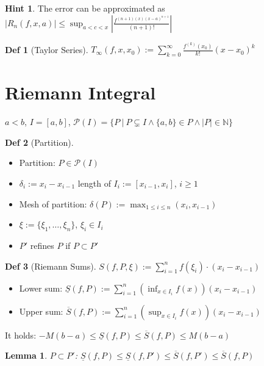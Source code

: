\documentclass[a4paper, 10pt]{article}
\newtheorem*{lemma}{Lemma}
\theoremstyle{definition}
\newtheorem*{definition}{Def}
\newtheorem*{note_wrapper}{Hint}
\theoremstyle{named}
\newenvironment{note}%
    {\begin{mdframed}[style=trick]\begin{note_wrapper}}%
    {\end{note_wrapper}\end{mdframed}}
\newcommand{\N}{\mathbb{N}}
\begin{document}
\begin{note}
    The error can be approximated as $|R_n(f, x, a)| \leq \sup_{a < c < x}|\frac{f^{(n + 1)(x)(x-a)^{n+1}}}{(n+1)!}|$
\end{note}

\begin{definition}[Taylor Series]
    $T_\infty(f, x, x_0) := \sum_{k = 0}^\infty \frac{f^{(k)}(x_0)}{k!}(x-x_0)^k$
\end{definition}

\section{Riemann Integral}
\begin{center}
    $a < b$, $I = [a, b]$, $\mathcal{P}(I) = \{P \ | \ P \subsetneq I \land \{a, b\} \in P \land |P| \in \N \}$
\end{center}
\begin{definition}[Partition]
    \begin{itemize}
        \item Partition:  $P \in \mathcal{P}(I)$
        \item $\delta_i := x_i - x_{i-1}$ length of $I_i := [x_{i-1}, x_i]$, $i \geq 1$
        \item Mesh of partition: $\delta(P) := \max_{1 \leq i \leq n}(x_i, x_{i - 1})$
        \item $\xi := \{\xi_1, \ldots, \xi_n\}$, $\xi_i \in I_i$
        \item $P'$ refines $P$ if $P \subset P'$
    \end{itemize}
\end{definition}

\begin{definition}[Riemann Sums]
    $S(f, P, \xi) := \sum_{i = 1}^n f(\xi_i) \cdot (x_i - x_{i - 1})$
    \begin{itemize}
        \item Lower sum: $\underline{S}(f, P) := \sum_{i = 1}^n (\inf_{x \in I_i} f(x)) (x_i - x_{i - 1})$
        \item Upper sum: $\overline{S}(f, P) := \sum_{i = 1}^n (\sup_{x \in I_i} f(x)) (x_i - x_{i - 1})$
    \end{itemize}
    It holds: $-M(b - a) \leq \underline{S}(f, P) \leq \overline{S}(f, P) \leq M(b - a)$
\end{definition}

\begin{lemma}
    $P \subset P'$: $\underline{S}(f, P) \leq \underline{S}(f, P') \leq \overline{S}(f, P') \leq \overline{S}(f, P)$
\end{lemma}
\end{document}
